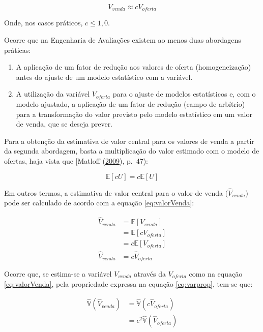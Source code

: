 \documentclass{article}
\begin{document}
\begin{equation}
\label{eq:varVenda}
V_{venda} \approx cV_{oferta}
\end{equation}

Onde, nos casos práticos, \(c \leq 1,0\).

Ocorre que na Engenharia de Avaliações existem ao menos duas abordagens
práticas:

\begin{enumerate}
\def\labelenumi{\arabic{enumi}.}
\item
  A aplicação de um fator de redução aos valores de oferta
  (homogeneização) antes do ajuste de um modelo estatístico com a
  variável.
\item
  A utilização da variável \(V_{oferta}\) para o ajuste de modelos
  estatísticos e, com o modelo ajustado, a aplicação de um fator de
  redução (campo de arbítrio) para a transformação do valor previsto
  pelo modelo estatístico em um valor de venda, que se deseja prever.
\end{enumerate}

Para a obtenção da estimativa de valor central para os valores de venda
a partir da segunda abordagem, basta a multiplicação do valor estimado
com o modelo de ofertas, haja vista que {[}Matloff
(\protect\hyperlink{ref-matloff2009}{2009}), p.~47):

\begin{equation}
\label{eq:Eprop}
\mathbb{E}[cU] = c\mathbb{E}[U]
\end{equation}

Em outros termos, a estimativa de valor central para o valor de venda
(\(\hat V_{venda}\)) pode ser calculado de acordo com a equação
\ref{eq:valorVenda}:

\begin{align}
\hat V_{venda} &= \mathbb{E}[V_{venda}] \nonumber \\ 
&= \mathbb{E}[cV_{oferta}] \nonumber \\
&= c\mathbb{E}[V_{oferta}] \nonumber \\
\hat V_{venda} &= c \hat V_{oferta} \label{eq:valorVenda}
\end{align}

Ocorre que, se estima-se a variável \(V_{venda}\) através da
\(V_{oferta}\) como na equação \ref{eq:valorVenda}, pela propriedade
expressa na equação \ref{eq:varprop}, tem-se que:

\begin{align}
\label{eq:varianciaVenda}
\hat{\mathbb{V}}(\hat V_{venda}) &= \hat{\mathbb{V}}(c \hat V_{oferta}) \\ 
&= c^2 \hat{\mathbb{V}}(\hat V_{oferta})
\end{align}
\end{document}
